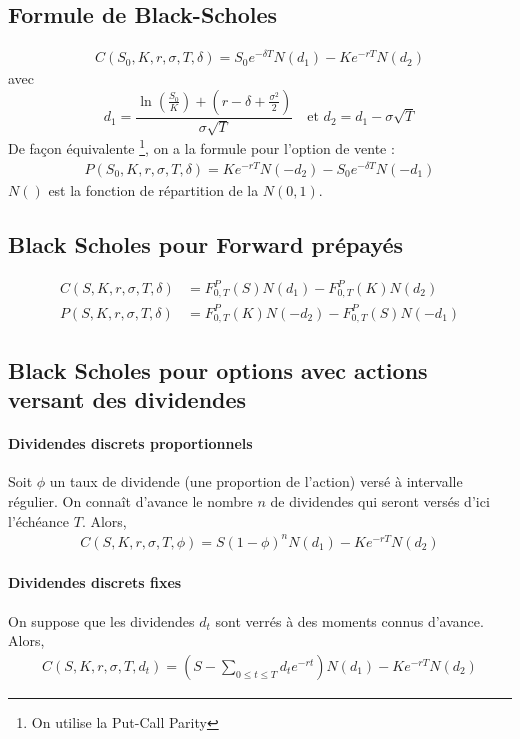 \documentclass[10pt, french]{article}
\begin{document}
\begin{multicols*}{2}
\section{Formule de Black-Scholes}
\begin{align*}
C(S_0, K, r, \sigma, T, \delta) = S_0 e^{-\delta T} N(d_1) - K e^{-rT} N(d_2)
\end{align*}
avec 
\[d_1 = \frac{\ln \left( \frac{S_0}{K}  \right) + \left( r - \delta + \frac{\sigma^2}{2} \right) }{\sigma \sqrt{T}}  \ \ \  \text{ et } d_2 = d_1 - \sigma \sqrt{T}\]
De façon équivalente \footnote{On utilise la Put-Call Parity}, on a la formule pour l'option de vente : 
\begin{align*}
P(S_0, K, r, \sigma, T, \delta) = K e^{-rT} N(-d_2) - S_0 e^{-\delta T} N(-d_1)
\end{align*}
$N()$ est la fonction de répartition de la $N(0,1)$.

\subsection*{Black Scholes pour Forward prépayés}
\begin{align*}
C(S, K, r, \sigma, T , \delta) & = F_{0,T}^{P}(S) N(d_1) - F_{0,T}^{P}(K) N(d_2) \\
P(S, K, r, \sigma, T , \delta)  & = F_{0,T}^{P}(K) N(-d_2) - F_{0,T}^{P}(S) N(-d_1)
\end{align*}

\subsection*{Black Scholes pour options avec actions versant des dividendes}

\paragraph{Dividendes discrets proportionnels} Soit $\phi$ un taux de dividende (une proportion de l'action) versé à intervalle régulier. On connaît d'avance le nombre $n$ de dividendes qui seront versés d'ici l'échéance $T$. Alors,
\begin{align*}
C(S, K, r, \sigma, T , \phi) = S(1 - \phi)^{n} N(d_1) - K e^{-rT} N(d_2)
\end{align*}

\paragraph{Dividendes discrets fixes} On suppose que les dividendes $d_t$ sont verrés à des moments connus d'avance. Alors,
\begin{align*}
C(S, K, r, \sigma, T , d_t) = \left( S - \sum_{0 \leq t \leq T} d_t e^{-rt}  \right) N(d_1) - K e^{-rT} N(d_2)
\end{align*}






\end{multicols*}
\end{document}

